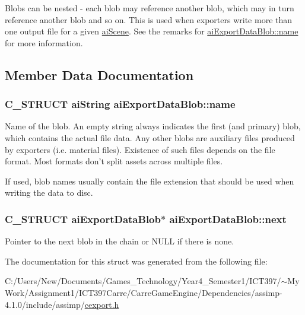 Blobs can be nested - each blob may reference another blob, which may in turn reference another blob and so on. This is used when exporters write more than one output file for a given \hyperlink{structai_scene}{aiScene}. See the remarks for \hyperlink{structai_export_data_blob_f7f006ac5ad818c0d81d520a84f74c3e}{aiExportDataBlob::name} for more information. 

\subsection{Member Data Documentation}
\hypertarget{structai_export_data_blob_f7f006ac5ad818c0d81d520a84f74c3e}{
\subsubsection[name]{\setlength{\rightskip}{0pt plus 5cm}C\_\-STRUCT {\bf aiString} {\bf aiExportDataBlob::name}}}
\label{structai_export_data_blob_f7f006ac5ad818c0d81d520a84f74c3e}


Name of the blob. An empty string always indicates the first (and primary) blob, which contains the actual file data. Any other blobs are auxiliary files produced by exporters (i.e. material files). Existence of such files depends on the file format. Most formats don't split assets across multiple files.

If used, blob names usually contain the file extension that should be used when writing the data to disc. \hypertarget{structai_export_data_blob_3e98fa760f45983ff1bccec6715f3817}{
\subsubsection[next]{\setlength{\rightskip}{0pt plus 5cm}C\_\-STRUCT {\bf aiExportDataBlob}$\ast$ {\bf aiExportDataBlob::next}}}
\label{structai_export_data_blob_3e98fa760f45983ff1bccec6715f3817}


Pointer to the next blob in the chain or NULL if there is none. 

The documentation for this struct was generated from the following file:\begin{CompactItemize}
\item 
C:/Users/New/Documents/Games\_\-Technology/Year4\_\-Semester1/ICT397/$\sim$My Work/Assignment1/ICT397Carre/CarreGameEngine/Dependencies/assimp-4.1.0/include/assimp/\hyperlink{cexport_8h}{cexport.h}\end{CompactItemize}
